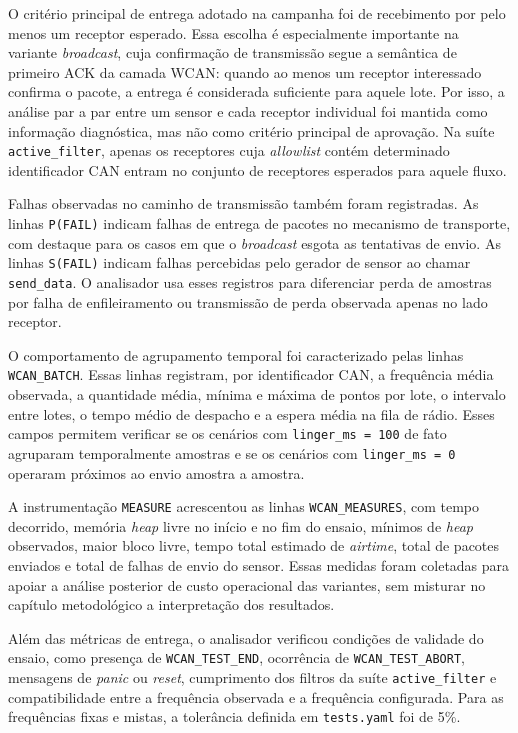 O critério principal de entrega adotado na campanha foi de recebimento por pelo menos um receptor esperado. Essa escolha é especialmente importante na variante \emph{broadcast}, cuja confirmação de transmissão segue a semântica de primeiro ACK da camada WCAN: quando ao menos um receptor interessado confirma o pacote, a entrega é considerada suficiente para aquele lote. Por isso, a análise par a par entre um sensor e cada receptor individual foi mantida como informação diagnóstica, mas não como critério principal de aprovação. Na suíte \texttt{active\_filter}, apenas os receptores cuja \emph{allowlist} contém determinado identificador CAN entram no conjunto de receptores esperados para aquele fluxo.

Falhas observadas no caminho de transmissão também foram registradas. As linhas \texttt{P(FAIL)} indicam falhas de entrega de pacotes no mecanismo de transporte, com destaque para os casos em que o \emph{broadcast} esgota as tentativas de envio. As linhas \texttt{S(FAIL)} indicam falhas percebidas pelo gerador de sensor ao chamar \texttt{send\_data}. O analisador usa esses registros para diferenciar perda de amostras por falha de enfileiramento ou transmissão de perda observada apenas no lado receptor.

O comportamento de agrupamento temporal foi caracterizado pelas linhas \texttt{WCAN\_BATCH}. Essas linhas registram, por identificador CAN, a frequência média observada, a quantidade média, mínima e máxima de pontos por lote, o intervalo entre lotes, o tempo médio de despacho e a espera média na fila de rádio. Esses campos permitem verificar se os cenários com \texttt{linger\_ms = 100} de fato agruparam temporalmente amostras e se os cenários com \texttt{linger\_ms = 0} operaram próximos ao envio amostra a amostra.

A instrumentação \texttt{MEASURE} acrescentou as linhas \texttt{WCAN\_MEASURES}, com tempo decorrido, memória \emph{heap} livre no início e no fim do ensaio, mínimos de \emph{heap} observados, maior bloco livre, tempo total estimado de \emph{airtime}, total de pacotes enviados e total de falhas de envio do sensor. Essas medidas foram coletadas para apoiar a análise posterior de custo operacional das variantes, sem misturar no capítulo metodológico a interpretação dos resultados.

Além das métricas de entrega, o analisador verificou condições de validade do ensaio, como presença de \texttt{WCAN\_TEST\_END}, ocorrência de \texttt{WCAN\_TEST\_ABORT}, mensagens de \emph{panic} ou \emph{reset}, cumprimento dos filtros da suíte \texttt{active\_filter} e compatibilidade entre a frequência observada e a frequência configurada. Para as frequências fixas e mistas, a tolerância definida em \texttt{tests.yaml} foi de 5\%. 